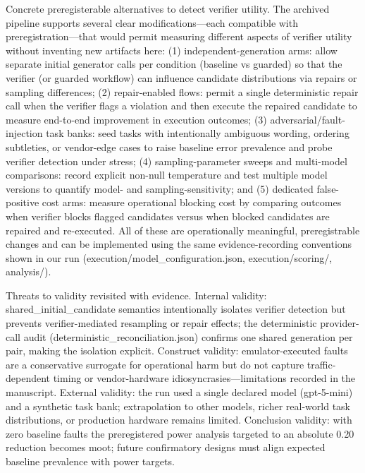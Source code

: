 \documentclass[conference]{IEEEtran}
\begin{document}
Concrete preregisterable alternatives to detect verifier utility. The archived pipeline supports several clear modifications---each compatible with preregistration---that would permit measuring different aspects of verifier utility without inventing new artifacts here: (1) independent-generation arms: allow separate initial generator calls per condition (baseline vs guarded) so that the verifier (or guarded workflow) can influence candidate distributions via repairs or sampling differences; (2) repair-enabled flows: permit a single deterministic repair call when the verifier flags a violation and then execute the repaired candidate to measure end-to-end improvement in execution outcomes; (3) adversarial/fault-injection task banks: seed tasks with intentionally ambiguous wording, ordering subtleties, or vendor-edge cases to raise baseline error prevalence and probe verifier detection under stress; (4) sampling-parameter sweeps and multi-model comparisons: record explicit non-null temperature and test multiple model versions to quantify model- and sampling-sensitivity; and (5) dedicated false-positive cost arms: measure operational blocking cost by comparing outcomes when verifier blocks flagged candidates versus when blocked candidates are repaired and re-executed. All of these are operationally meaningful, preregistrable changes and can be implemented using the same evidence-recording conventions shown in our run (execution/model\_configuration.json, execution/scoring/, analysis/).

Threats to validity revisited with evidence. Internal validity: shared\_initial\_candidate semantics intentionally isolates verifier detection but prevents verifier-mediated resampling or repair effects; the deterministic provider-call audit (deterministic\_reconciliation.json) confirms one shared generation per pair, making the isolation explicit. Construct validity: emulator-executed faults are a conservative surrogate for operational harm but do not capture traffic-dependent timing or vendor-hardware idiosyncrasies---limitations recorded in the manuscript. External validity: the run used a single declared model (gpt-5-mini) and a synthetic task bank; extrapolation to other models, richer real-world task distributions, or production hardware remains limited. Conclusion validity: with zero baseline faults the preregistered power analysis targeted to an absolute 0.20 reduction becomes moot; future confirmatory designs must align expected baseline prevalence with power targets.
\end{document}
